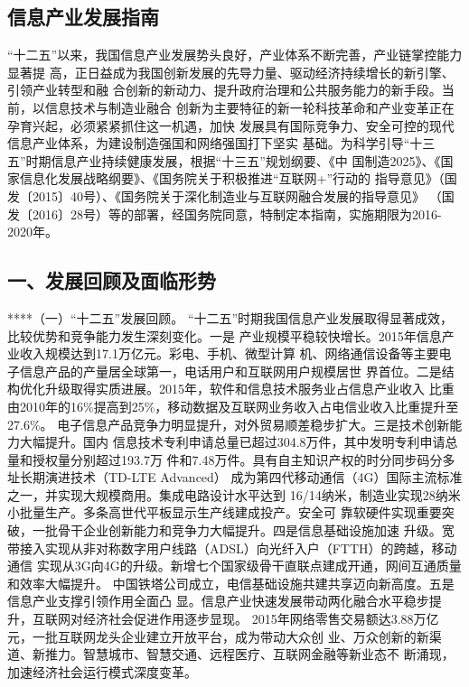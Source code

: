 \documentclass[11pt]{ctexart}
\begin{document}
{{{{\subsection{信息产业发展指南}
\label{sec:orga4c2d7f}


“十二五”以来，我国信息产业发展势头良好，产业体系不断完善，产业链掌控能力显著提
高，正日益成为我国创新发展的先导力量、驱动经济持续增长的新引擎、引领产业转型和融
合创新的新动力、提升政府治理和公共服务能力的新手段。当前，以信息技术与制造业融合
创新为主要特征的新一轮科技革命和产业变革正在孕育兴起，必须紧紧抓住这一机遇，加快
发展具有国际竞争力、安全可控的现代信息产业体系，为建设制造强国和网络强国打下坚实
基础。为科学引导“十三五”时期信息产业持续健康发展，根据“十三五”规划纲要、《中
国制造2025》、《国家信息化发展战略纲要》、《国务院关于积极推进“互联网+”行动的
指导意见》（国发〔2015〕40号）、《国务院关于深化制造业与互联网融合发展的指导意见》
（国发〔2016〕28号）等的部署，经国务院同意，特制定本指南，实施期限为2016-2020年。


\subsection{一、发展回顾及面临形势}
\label{sec:org4446b50}
****（一）“十二五”发展回顾。
“十二五”时期我国信息产业发展取得显著成效，比较优势和竞争能力发生深刻变化。一是
产业规模平稳较快增长。2015年信息产业收入规模达到17.1万亿元。彩电、手机、微型计算
机、网络通信设备等主要电子信息产品的产量居全球第一，电话用户和互联网用户规模居世
界首位。二是结构优化升级取得实质进展。2015年，软件和信息技术服务业占信息产业收入
比重由2010年的16\%提高到25\%，移动数据及互联网业务收入占电信业收入比重提升至27.6\%。
电子信息产品竞争力明显提升，对外贸易顺差稳步扩大。三是技术创新能力大幅提升。国内
信息技术专利申请总量已超过304.8万件，其中发明专利申请总量和授权量分别超过193.7万
件和7.48万件。具有自主知识产权的时分同步码分多址长期演进技术（TD-LTE Advanced）
成为第四代移动通信（4G）国际主流标准之一，并实现大规模商用。集成电路设计水平达到
16/14纳米，制造业实现28纳米小批量生产。多条高世代平板显示生产线建成投产。安全可
靠软硬件实现重要突破，一批骨干企业创新能力和竞争力大幅提升。四是信息基础设施加速
升级。宽带接入实现从非对称数字用户线路（ADSL）向光纤入户（FTTH）的跨越，移动通信
实现从3G向4G的升级。新增七个国家级骨干直联点建成开通，网间互通质量和效率大幅提升。
中国铁塔公司成立，电信基础设施共建共享迈向新高度。五是信息产业支撑引领作用全面凸
显。信息产业快速发展带动两化融合水平稳步提升，互联网对经济社会促进作用逐步显现。
2015年网络零售交易额达3.88万亿元，一批互联网龙头企业建立开放平台，成为带动大众创
业、万众创新的新渠道、新推力。智慧城市、智慧交通、远程医疗、互联网金融等新业态不
断涌现，加速经济社会运行模式深度变革。

}}}}
\end{document}
